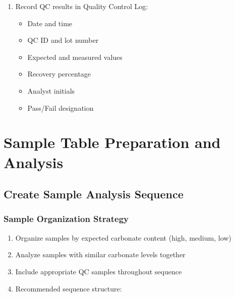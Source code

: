 \documentclass[11pt,a4paper]{article}\usepackage[]{graphicx}\usepackage[]{xcolor}
\begin{document}
\begin{enumerate}[noitemsep]
\begin{itemize}
    \end{itemize}
    \item Record QC results in Quality Control Log:
    \begin{itemize}
        \item Date and time
        \item QC ID and lot number
        \item Expected and measured values
        \item Recovery percentage
        \item Analyst initials
        \item Pass/Fail designation
    \end{itemize}
\end{enumerate}

\section{Sample Table Preparation and Analysis}

\subsection{Create Sample Analysis Sequence}

\subsubsection{Sample Organization Strategy}
\begin{enumerate}[noitemsep]
    \item Organize samples by expected carbonate content (high, medium, low)
    \item Analyze samples with similar carbonate levels together
    \item Include appropriate QC samples throughout sequence
    \item Recommended sequence structure:
\end{enumerate}
\end{document}
